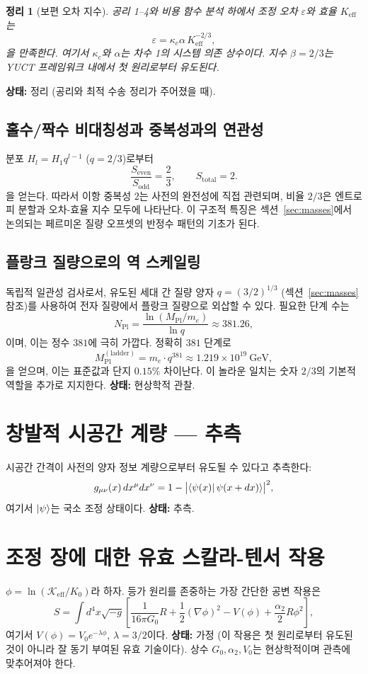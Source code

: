 \documentclass[11pt,a4paper]{article}
\newtheorem{theorem}{정리}[section]
\newcommand{\Mpl}{M_{\mathrm{Pl}}}
\begin{document}
	\begin{theorem}[보편 오차 지수]
		공리 1–4와 비용 함수 분석 하에서 조정 오차 \(\varepsilon\)와 효율 \(K_{\mathrm{eff}}\)는
		\[
		\boxed{\varepsilon = \kappa_c \alpha \, K_{\mathrm{eff}}^{-2/3}},
		\]
		을 만족한다. 여기서 \(\kappa_c\)와 \(\alpha\)는 차수 1의 시스템 의존 상수이다. 지수 \(\beta = 2/3\)는 YUCT 프레임워크 내에서 첫 원리로부터 유도된다.
	\end{theorem}
	\textbf{상태:} 정리 (공리와 최적 수송 정리가 주어졌을 때).
	
	\subsection{홀수/짝수 비대칭성과 중복성과의 연관성}
	분포 \(H_l = H_1 q^{l-1}\) (\(q=2/3\))로부터
	\[
	\frac{S_{\mathrm{even}}}{S_{\mathrm{odd}}} = \frac{2}{3}, \qquad S_{\mathrm{total}} = 2.
	\]
	을 얻는다. 따라서 이항 중복성 \(2\)는 사전의 완전성에 직접 관련되며, 비율 \(2/3\)은 엔트로피 분할과 오차-효율 지수 모두에 나타난다. 이 구조적 특징은 섹션~\ref{sec:masses}에서 논의되는 페르미온 질량 오프셋의 반정수 패턴의 기초가 된다.
	
	\subsection{플랑크 질량으로의 역 스케일링}
	독립적 일관성 검사로서, 유도된 세대 간 질량 양자 \(q = (3/2)^{1/3}\) (섹션~\ref{sec:masses} 참조)를 사용하여 전자 질량에서 플랑크 질량으로 외삽할 수 있다. 필요한 단계 수는
	\[
	N_{\mathrm{Pl}} = \frac{\ln(\Mpl/m_e)}{\ln q} \approx 381.26,
	\]
	이며, 이는 정수 \(381\)에 극히 가깝다. 정확히 \(381\) 단계로
	\[
	\Mpl^{\mathrm{(ladder)}} = m_e \cdot q^{381} \approx 1.219\times10^{19}\ \mathrm{GeV},
	\]
	을 얻으며, 이는 표준값과 단지 \(0.15\%\) 차이난다. 이 놀라운 일치는 숫자 \(2/3\)의 기본적 역할을 추가로 지지한다. \textbf{상태:} 현상학적 관찰.
	
	\section{창발적 시공간 계량 — 추측}
	\label{sec:metric}
	시공간 간격이 사전의 양자 정보 계량으로부터 유도될 수 있다고 추측한다:
	\[
	g_{\mu\nu}(x) \, dx^\mu dx^\nu = 1 - \bigl| \bra{\psi(x)} \psi(x+dx) \rangle \bigr|^2,
	\]
	여기서 \(\ket{\psi}\)는 국소 조정 상태이다. \textbf{상태:} 추측.
	
	\section{조정 장에 대한 유효 스칼라-텐서 작용}
	\label{sec:action}
	\(\phi = \ln(\mathcal{K}_{\mathrm{eff}}/K_0)\)라 하자. 등가 원리를 존중하는 가장 간단한 공변 작용은
	\begin{equation}
		S = \int d^4x\sqrt{-g}\left[ \frac{1}{16\pi G_0} R + \frac12(\nabla\phi)^2 - V(\phi) + \frac{\alpha_2}{2}R\phi^2 \right],
		\label{eq:action}
	\end{equation}
	여기서 \(V(\phi) = V_0 e^{-\lambda\phi}\), \(\lambda = 3/2\)이다. \textbf{상태:} 가정 (이 작용은 첫 원리로부터 유도된 것이 아니라 잘 동기 부여된 유효 기술이다). 상수 \(G_0, \alpha_2, V_0\)는 현상학적이며 관측에 맞추어져야 한다.
	
\end{document}
